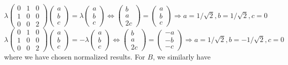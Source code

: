 \documentclass{article}
\begin{document}
\[
    \lambda
  \begin{pmatrix}
    0 & 1 & 0 \\
    1 & 0 & 0 \\
    0 & 0 & 2
  \end{pmatrix}
  \begin{pmatrix}
    a \\
    b \\
    c
  \end{pmatrix}
  =\lambda
  \begin{pmatrix}
    a \\
    b \\
    c
  \end{pmatrix}
  \Leftrightarrow
  \begin{pmatrix}
     b \\
     a \\
    2 c

  \end{pmatrix}
  =
  \begin{pmatrix}
    a \\
    b \\
    c
  \end{pmatrix}
  \Rightarrow a=1/\sqrt{2}, b=1/\sqrt{2}, c=0
\]
\[
    \lambda
  \begin{pmatrix}
    0 & 1 & 0 \\
    1 & 0 & 0 \\
    0 & 0 & 2
  \end{pmatrix}
  \begin{pmatrix}
    a \\
    b \\
    c
  \end{pmatrix}
  =-\lambda
  \begin{pmatrix}
    a \\
    b \\
    c
  \end{pmatrix}
  \Leftrightarrow
  \begin{pmatrix}
     b \\
     a \\
    2 c

  \end{pmatrix}
  =
  \begin{pmatrix}
    -a \\
    -b \\
    -c
  \end{pmatrix}
  \Rightarrow a=1/\sqrt{2}, b=-1/\sqrt{2}, c=0
\]
where we have chosen normalized results.
For $B$, we similarly have
\end{document}
